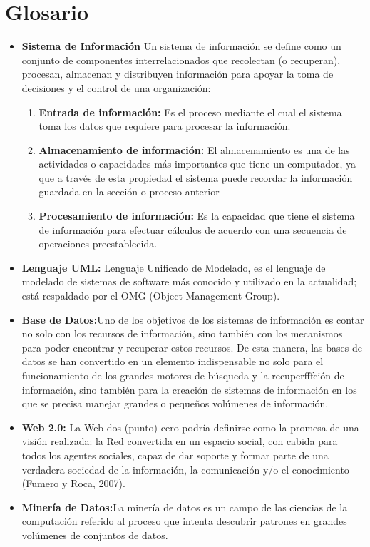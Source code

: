 \section{Glosario}
\begin{itemize}

\item{\textbf{Sistema de Información} Un sistema de información se define como un conjunto de componentes interrelacionados que recolectan (o recuperan), procesan, almacenan y distribuyen información para apoyar la toma de decisiones y el control de una organización:
	\begin{enumerate}
		\item \textbf{ Entrada de información:} Es el proceso mediante el cual el sistema toma los datos que requiere para procesar la información.		
		
		\item \textbf{ Almacenamiento de información: }El almacenamiento es una de las actividades o capacidades más importantes que tiene un computador, ya que a través de esta propiedad el sistema puede recordar la información guardada en la sección o proceso anterior
				
		\item \textbf{ Procesamiento de información:} Es la capacidad que tiene el sistema de información para efectuar cálculos de acuerdo con una secuencia de operaciones preestablecida.  			
	\end{enumerate} 
}


\item \textbf{Lenguaje UML:} Lenguaje Unificado de Modelado, es el lenguaje de modelado de sistemas de software más conocido y utilizado en la actualidad; está respaldado por el OMG (Object Management Group).  

\item \textbf{Base de Datos:}Uno de los objetivos de los sistemas de información es contar no solo con los recursos de información, sino también con los mecanismos para poder encontrar y recuperar estos recursos.  De esta manera, las bases de datos se han convertido en un elemento indispensable no solo para el funcionamiento de los grandes motores de búsqueda y la recuperfffción de información, sino también para la creación de sistemas de información en los que se precisa manejar grandes o pequeños volúmenes de información. 


\item \textbf{Web 2.0:} \cite{Cuadro}  La Web dos (punto) cero podría definirse como la promesa de una visión realizada: la Red convertida en un espacio social, con cabida para todos los agentes sociales, capaz de dar soporte y formar parte de una verdadera sociedad de la información, la comunicación y/o el conocimiento (Fumero y Roca, 2007).

\item \textbf{Minería de Datos:}La minería de datos es un campo de las ciencias de la computación referido al proceso que intenta descubrir patrones en grandes volúmenes de conjuntos de datos.
 

\end{itemize}
